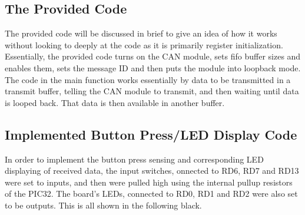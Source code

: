 \documentclass[12pt]{article}
\begin{document}
\subsection*{\normalsize The Provided Code}
The provided code will be discussed in brief to give an idea of how it works without looking to deeply at the code as it is primarily register initialization. Essentially, the provided code turns on the CAN module, sets fifo buffer sizes and enables them, sets the message ID and then puts the module into loopback mode. The code in the main function works essentially by data to be transmitted in a transmit buffer, telling the CAN module to transmit, and then waiting until data is looped back. That data is then available in another buffer.
\subsection*{\normalsize Implemented Button Press/LED Display Code}
In order to implement the button press sensing and corresponding LED displaying of received data, the input switches, onnected to RD6, RD7 and RD13 were set to inputs, and then were pulled high using the internal pullup resistors of the PIC32. The board's LEDs, connected to RD0, RD1 and RD2 were also set to be outputs. This is all shown in the following black. 
 
\end{document}
